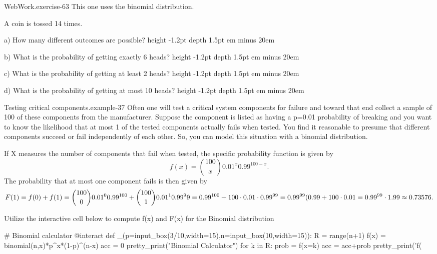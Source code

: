 \documentclass[10pt,]{book}
\newcommand{\fillin}[1]{\leavevmode\leaders\vrule height -1.2pt depth 1.5pt \hskip #1em minus #1em \null}
\numberwithin{equation}{section}
\begin{document}
\hypertarget{p-909}{}%
\begin{inlineexercise}{WebWork.}{exercise-63}%
\hypertarget{p-910}{}%
This one uses the binomial distribution.%
\par\medskip
\hypertarget{p-911}{}%
A coin is tossed 14 times.%
\par
\hypertarget{p-912}{}%
a) How many different outcomes are possible?   \fillin{20}%
\par
\hypertarget{p-913}{}%
b) What is the probability of getting exactly 6 heads?  \fillin{20}%
\par
\hypertarget{p-914}{}%
c) What is the probability of getting at least 2 heads?  \fillin{20}%
\par
\hypertarget{p-915}{}%
d) What is the probability of getting at most 10 heads?  \fillin{20}%
\end{inlineexercise}
%
\begin{example}{Testing critical components.}{example-37}%
\hypertarget{p-916}{}%
Often one will test a critical system components for failure and toward that end collect a sample of 100 of these components from the manufacturer. Suppose the component is listed as having a p=0.01 probability of breaking and you want to know the likelihood that at most 1 of the tested components actually fails when tested. You find it reasonable to presume that different components succeed or fail independently of each other. So, you can model this situation with a binomial distribution.%
\par
\hypertarget{p-917}{}%
If X measures the number of components that fail when tested, the specific probability function is given by%
\begin{equation*}
f(x) = \binom{100}{x} 0.01^x 0.99^{100-x}.
\end{equation*}
The probability that at most one component fails is then given by%
\begin{equation*}
F(1) = f(0) + f(1) = \binom{100}{0} 0.01^0 0.99^{100} + \binom{100}{1} 0.01^1 0.99^99 \\ = 0.99^{100} + 100 \cdot 0.01 \cdot 0.99^{99} = 0.99^{99}(0.99 + 100 \cdot 0.01 \\ = 0.99^{99} \cdot 1.99 \approx 0.73576.
\end{equation*}
%
\end{example}
\hypertarget{p-918}{}%
Utilize the interactive cell below to compute f(x) and F(x) for the Binomial distribution%
\par
\hypertarget{p-919}{}%
\leavevmode%
\begin{sageinput}
# Binomial calculator
@interact
def _(p=input_box(3/10,width=15),n=input_box(10,width=15)):
    R = range(n+1)
    f(x) = binomial(n,x)*p^x*(1-p)^(n-x)
    acc = 0
    pretty_print("Binomial Calculator")
    for k in R:
        prob = f(x=k)
        acc = acc+prob
        pretty_print('f(%
\end{sageinput}
\end{document}
